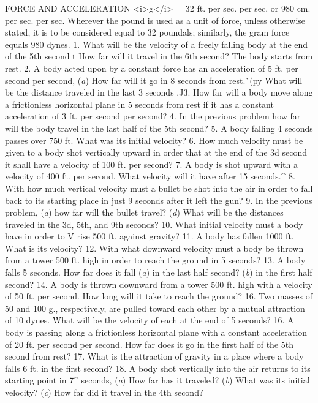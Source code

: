 FORCE AND ACCELERATION
<i>g</i> = 32 ft. per sec. per sec, or 980 cm. per sec. per sec.
Wherever the pound is used as a unit of force, unless otherwise stated, it is to be considered equal to 32 poundals; similarly, the gram force equals 980 dynes.
1. What will be the velocity of a freely falling body at the end of the 5th second t How far will it travel in the 6th second? The body starts from rest.
2. A body acted upon by a constant force has an acceleration of 5 ft. per second per second, (\emph{a}) How far will it go in 8 seconds from rest.^^ (py What will be the distance traveled in the last 3 seconds .^^
3. How far will a body move along a frictionless horizontal plane in 5 seconds from rest if it has a constant acceleration of 3 ft. per second per second?
4. In the previous problem how far will the body travel in the last half of the 5th second?
5. A body falling 4 seconds passes over 750 ft. What was its initial velocity?
6. How much velocity must be given to a body shot vertically upward in order that at the end of the 3d second it shall have a velocity of 100 ft. per second?
7. A body is shot upward with a velocity of 400 ft. per second. What velocity will it have after 15 seconds.^
8. With how much vertical velocity must a bullet be shot into the air in order to fall back to its starting place in just 9 seconds after it left the gun?
9. In the previous problem, (\emph{a}) how far will the bullet travel? (\emph{d}) What will be the distances traveled in the 3d, 5th, and 9th seconds?
10. What initial velocity must a body have in order to V rise 500 ft. against gravity?
11. A body has fallen 1000 ft. What is its velocity?
12. With what downward velocity must a body be thrown from a tower 500 ft. high in order to reach the ground in 5 seconds?
13. A body falls 5 seconds. How far does it fall (\emph{a}) in the last half second? (\emph{b}) in the first half second?
14. A body is thrown downward from a tower 500 ft. high with a velocity of 50 ft. per second. How long will it take to reach the ground?
16. Two masses of 50 and 100 g., respectively, are pulled toward each other by a mutual attraction of 10 dynes. What will be the velocity of each at the end of 5 seconds?
16. A body is passing along a frictionless horizontal plane with a constant acceleration of 20 ft. per second per second. How far does it go in the first half of the 5th second from rest?
17. What is the attraction of gravity in a place where a body falls 6 ft. in the first second?
18. A body shot vertically into the air returns to its starting point in 7^ seconds, (\emph{a}) How far has it traveled? (\emph{b}) What was its initial velocity? (\emph{c}) How far did it travel in the 4th second?
